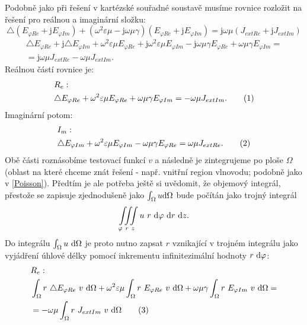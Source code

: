 \documentclass[12pt,a4paper,oneside]{article}
\numberwithin{equation}{section} %
\numberwithin{figure}{section} %
\numberwithin{table}{section} %
\newcommand{\mj}{\mathrm{j}} %
\newcommand\numberthis{\addtocounter{equation}{1}\tag{\theequation}}
\begin{document}
Podobně jako při řešení v kartézské souřadné soustavě musíme rovnice rozložit na řešení pro reálnou a imaginární složku:
\begin{equation}
\triangle (E _{\varphi Re} + \mj E _{\varphi Im}) + (\omega ^2 \varepsilon \mu - \mj \omega \mu \gamma) (E _{\varphi Re} + \mj E _{\varphi Im}) = \mj \omega \mu (J _{extRe} + \mj J _{extIm})
\end{equation}
\begin{equation}
\begin{split}
\triangle E _{\varphi Re} + \mj \triangle E _{\varphi Im} + \omega ^2 \varepsilon \mu E_ {\varphi Re} + \mj \omega ^2 \varepsilon \mu E _{\varphi Im} - \mj \omega \mu \gamma E _{\varphi Re} + \omega \mu \gamma E _{\varphi Im} =\\
= \mj \omega \mu J _{extRe} - \omega \mu J _{extIm} .
\end{split}
\end{equation}
Reálnou částí rovnice je:
\begin{align*}
&R_{e}:
\\
&\triangle E_ {\varphi Re} + \omega ^2 \varepsilon \mu E_ {\varphi Re} + \omega \mu \gamma E _{\varphi Im} = - \omega \mu J _{extIm} .
\numberthis
\end{align*}
Imaginární potom:
\begin{align*}
&I_{m}:
\\
&\triangle E _{\varphi Im} + \omega ^2 \varepsilon \mu E _{\varphi Im} - \omega \mu \gamma E _{\varphi Re} = \omega \mu J _{extRe} .
\numberthis
\end{align*}
Obě části roznásobíme testovací funkcí $v$ a následně je zintegrujeme po ploše $\Omega$ (oblast na které chceme znát řešení - např. vnitřní region vlnovodu; podobně jako v \ref{Poisson}). Předtím je ale potřeba ještě si uvědomit, že objemový integrál, přestože se zapisuje zjednodušeně jako $\int _{\Omega} u \mathrm{d} \Omega$ bude počítán jako trojný integrál 
\begin{equation}
\label{trojnyI}
\iiint \limits_{\varphi ~ r ~ z} u ~ r ~ \mathrm{d} \varphi ~ \mathrm{d} r ~ \mathrm{d} z . 
\end{equation}
Do integrálu $\int _{\Omega} u ~ \mathrm{d} \Omega$ je proto nutno zapsat $r$ vznikající v trojném integrálu jako vyjádření úhlové délky pomocí inkrementu infinitezimální hodnoty $r ~ \mathrm{d} \varphi$: 
\begin{align*}
&R_e:
\\
&\int _{\Omega} r ~ \triangle E _{\varphi Re} ~ v ~ \ud \Omega + \omega ^2 \varepsilon \mu \int _{\Omega} r ~ E _{\varphi Re} ~ v ~ \ud \Omega +  \omega \mu \gamma \int _{\Omega} r ~ E _{\varphi Im} ~ v ~ \ud \Omega =\\
&= - \omega \mu \int _{\Omega} r ~ J _{extIm} ~ v ~ \ud \Omega
\numberthis
\end{align*}
\end{document}
